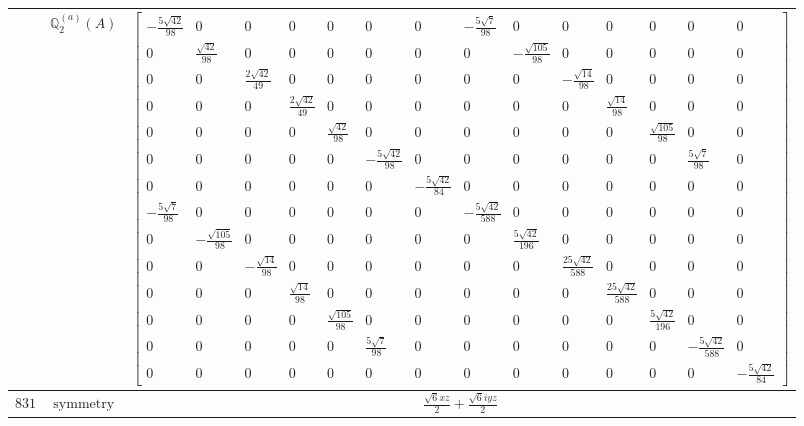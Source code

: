 \documentclass[fleqn,8pt,landscape]{jsarticle}
\begin{document}
\begin{longtable}{ccc}
$  $ & $ \mathbb{Q}_{2}^{(a)}(A) $ & $ \begin{bmatrix} - \frac{5 \sqrt{42}}{98} & 0 & 0 & 0 & 0 & 0 & 0 & - \frac{5 \sqrt{7}}{98} & 0 & 0 & 0 & 0 & 0 & 0 \\ 0 & \frac{\sqrt{42}}{98} & 0 & 0 & 0 & 0 & 0 & 0 & - \frac{\sqrt{105}}{98} & 0 & 0 & 0 & 0 & 0 \\ 0 & 0 & \frac{2 \sqrt{42}}{49} & 0 & 0 & 0 & 0 & 0 & 0 & - \frac{\sqrt{14}}{98} & 0 & 0 & 0 & 0 \\ 0 & 0 & 0 & \frac{2 \sqrt{42}}{49} & 0 & 0 & 0 & 0 & 0 & 0 & \frac{\sqrt{14}}{98} & 0 & 0 & 0 \\ 0 & 0 & 0 & 0 & \frac{\sqrt{42}}{98} & 0 & 0 & 0 & 0 & 0 & 0 & \frac{\sqrt{105}}{98} & 0 & 0 \\ 0 & 0 & 0 & 0 & 0 & - \frac{5 \sqrt{42}}{98} & 0 & 0 & 0 & 0 & 0 & 0 & \frac{5 \sqrt{7}}{98} & 0 \\ 0 & 0 & 0 & 0 & 0 & 0 & - \frac{5 \sqrt{42}}{84} & 0 & 0 & 0 & 0 & 0 & 0 & 0 \\ - \frac{5 \sqrt{7}}{98} & 0 & 0 & 0 & 0 & 0 & 0 & - \frac{5 \sqrt{42}}{588} & 0 & 0 & 0 & 0 & 0 & 0 \\ 0 & - \frac{\sqrt{105}}{98} & 0 & 0 & 0 & 0 & 0 & 0 & \frac{5 \sqrt{42}}{196} & 0 & 0 & 0 & 0 & 0 \\ 0 & 0 & - \frac{\sqrt{14}}{98} & 0 & 0 & 0 & 0 & 0 & 0 & \frac{25 \sqrt{42}}{588} & 0 & 0 & 0 & 0 \\ 0 & 0 & 0 & \frac{\sqrt{14}}{98} & 0 & 0 & 0 & 0 & 0 & 0 & \frac{25 \sqrt{42}}{588} & 0 & 0 & 0 \\ 0 & 0 & 0 & 0 & \frac{\sqrt{105}}{98} & 0 & 0 & 0 & 0 & 0 & 0 & \frac{5 \sqrt{42}}{196} & 0 & 0 \\ 0 & 0 & 0 & 0 & 0 & \frac{5 \sqrt{7}}{98} & 0 & 0 & 0 & 0 & 0 & 0 & - \frac{5 \sqrt{42}}{588} & 0 \\ 0 & 0 & 0 & 0 & 0 & 0 & 0 & 0 & 0 & 0 & 0 & 0 & 0 & - \frac{5 \sqrt{42}}{84} \end{bmatrix} $ \\ \hline
$ 831 $ & $ \text{symmetry} $ & $ \frac{\sqrt{6} x z}{2} + \frac{\sqrt{6} i y z}{2} $ \\

\end{longtable}
\end{document}
